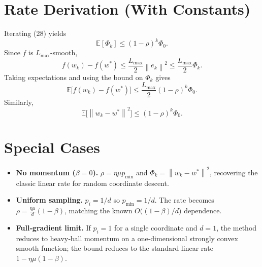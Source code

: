 \documentclass{article}
\newcommand{\E}{\mathbb{E}}
\newcommand{\norm}[1]{\left\|#1\right\|}
\begin{document}
\section*{Rate Derivation (With Constants)}
Iterating (28) yields
\[
\E[\Phi_k]\le (1-\rho)^{k}\Phi_0 .
\]
Since $f$ is $L_{\max}$‑smooth,
\[
f(w_k)-f(w^*)\le\frac{L_{\max}}{2}\norm{e_k}^{2}
\le\frac{L_{\max}}{2}\Phi_k .
\]
Taking expectations and using the bound on $\Phi_k$ gives
\[
\E\!\bigl[f(w_k)-f(w^*)\bigr]\le\frac{L_{\max}}{2}(1-\rho)^{k}\Phi_0 .
\]
Similarly,
\[
\E\!\bigl[\norm{w_k-w^*}^{2}\bigr]\le (1-\rho)^{k}\Phi_0 .
\]

\section*{Special Cases}
\begin{itemize}
\item \textbf{No momentum ($\beta=0$).}  $\rho=\eta\mu p_{\min}$ and $\Phi_k=\norm{w_k-w^*}^{2}$, recovering the classic linear rate for random coordinate descent.
\item \textbf{Uniform sampling.}  $p_i=1/d$ so $p_{\min}=1/d$.  The rate becomes $\rho=\frac{\eta\mu}{d}(1-\beta)$, matching the known $O\!\bigl((1-\beta)/d\bigr)$ dependence.
\item \textbf{Full‑gradient limit.}  If $p_i=1$ for a single coordinate and $d=1$, the method reduces to heavy‑ball momentum on a one‑dimensional strongly convex smooth function; the bound reduces to the standard linear rate $1-\eta\mu(1-\beta)$.
\end{itemize}
\end{document}
